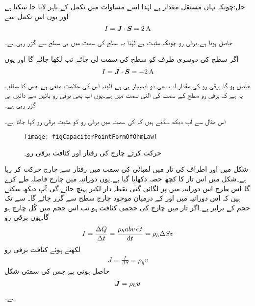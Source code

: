 حل:چونکہ  یہاں  مستقل مقدار ہے لہٰذا اسے مساوات  میں تکمل کے باہر لایا جا سکتا ہے اور یوں اس تکمل سے
\begin{align*}
I={{\boldsymbol{J}}} \cdot {\ensuremath{{\boldsymbol{S}}}}= \SI{2}{\ampere}
\end{align*} 
حاصل ہوتا ہے۔برقی رو چونکہ مثبت ہے لہٰذا یہ سطح کی سمت میں ہی سطح سے گزر رہی ہے۔

اگر سطح کی دوسری طرف کو سطح کی سمت لی جائے تب  لکھا جائے گا اور یوں
\begin{align*}
I={{\boldsymbol{J}}} \cdot {\ensuremath{{\boldsymbol{S}}}}= \SI{-2}{\ampere}
\end{align*} 
حاصل ہو گا۔برقی رو کی مقدار اب بھی دو ایمپیئر ہی ہے البتہ اس کی علامت منفی ہے جس کا مطلب یہ ہے کہ برقی رو سطح کے سمت کی الٹی سمت میں ہے۔یوں اب بھی برقی رو بائیں سے دائیں ہی  گزر رہی ہے۔

%

اس مثال سے آپ دیکھ سکتے ہیں کہ  کی سمت میں برقی رو کو مثبت برقی رو کہا جاتا ہے۔
\begin{figure}
\centering
\texttt{[image: figCapacitorPointFormOfOhmLaw]}
\caption{حرکت کرتے چارج کی رفتار اور کثافت برقی رو۔}
\label{شکل_کپیسٹر_حرکت_کرتا_چارج_اور_کثافت_برقی_رو}
\end{figure}

شکل  میں  اور  اطراف کی تار میں لمبائی کی سمت میں  رفتار سے چارج حرکت کر رہا ہے۔شکل میں اس تار کا کچھ حصہ دکھایا گیا ہے۔یوں  دورانیہ میں چارج  فاصلہ طے کرے گا۔اس طرح اس دورانیہ میں  پر لگائی گئی نقطہ دار لکیر  پہنچ جائے گی۔آپ دیکھ سکتے ہیں کہ اس دورانیہ میں  اور  کے درمیان موجود چارج سطح  سے گزر جائے گا۔ سے  تک حجم  کے برابر ہے۔اگر تار میں چارج کی حجمی کثافت  ہو تب اس حجم میں  کُل چارج  ہو گا۔یوں برقی رو
\begin{align*}
I=\frac{\Delta Q}{\Delta t}=\frac{\rho_h a b v \dif t}{\dif t}=\rho_h \Delta S v
\end{align*}
لکھتے ہوئے  کثافت برقی رو
\begin{align*}
J=\frac{I}{\Delta S}=\rho_h v
\end{align*}
حاصل ہوتی ہے جس کی سمتی شکل
\begin{align}\label{مساوات_کپیسٹر_کثافت_رو_مساوی_کثافت_چارج_ضرب_رفتار}
{\ensuremath{{\boldsymbol{J}}}}=\rho_h {{\boldsymbol{v}}}
\end{align}
ہے۔

